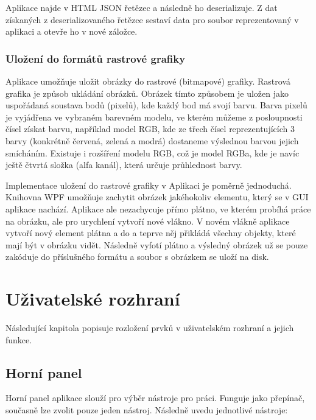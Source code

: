 \documentclass[
  field=inf,
  biblatex,
  glossaries,
  index
]{kidiplom}
\begin{document}
Aplikace najde v HTML JSON řetězec a následně ho deserializuje. Z dat získaných z deserializovaného řetězce sestaví data pro soubor reprezentovaný v aplikaci a otevře ho v nové záložce.

\subsubsection{Uložení do formátů rastrové grafiky}
Aplikace umožňuje uložit obrázky do rastrové (bitmapové) grafiky. Rastrová grafika je způsob ukládání obrázků. Obrázek tímto způsobem je uložen jako uspořádaná soustava bodů (pixelů), kde každý bod má svojí barvu. Barva pixelů je vyjádřena ve vybraném barevném modelu, ve kterém můžeme z posloupnosti čísel získat barvu, například model RGB, kde ze třech čísel reprezentujících 3 barvy (konkrétně červená, zelená a modrá) dostaneme výslednou barvou jejich smícháním. Existuje i rozšíření modelu RGB, což je model RGBa, kde je navíc ještě čtvrtá složka (alfa kanál), která určuje průhlednost barvy.

Implementace uložení do rastrové grafiky v Aplikaci je poměrně jednoduchá. Knihovna WPF umožňuje zachytit obrázek jakéhokoliv elementu, který se v GUI aplikace nachází. Aplikace ale nezachycuje přímo plátno, ve kterém probíhá práce na obrázku, ale pro urychlení vytvoří nové vlákno. V novém vlákně aplikace vytvoří nový element plátna a do a teprve něj přikládá všechny objekty, které mají být v obrázku vidět. Následně vyfotí plátno a výsledný obrázek už se pouze zakóduje do příslušného formátu a soubor s obrázkem se uloží na disk.


\section{Uživatelské rozhraní}

Následující kapitola popisuje rozložení prvků v uživatelském rozhraní a jejich funkce.

\subsection{Horní panel}
Horní panel aplikace slouží pro výběr nástroje pro práci. Funguje jako přepínač, současně lze zvolit pouze jeden nástroj. Následně uvedu jednotlivé nástroje:
\end{document}
